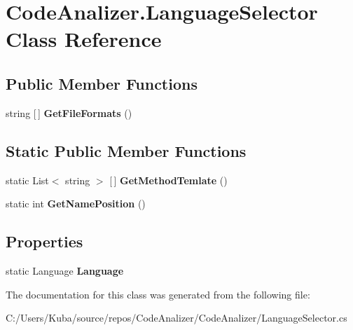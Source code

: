 \hypertarget{class_code_analizer_1_1_language_selector}{}\section{Code\+Analizer.\+Language\+Selector Class Reference}
\label{class_code_analizer_1_1_language_selector}
\subsection*{Public Member Functions}
\begin{DoxyCompactItemize}
\item 
\mbox{\label{class_code_analizer_1_1_language_selector_a47eec0d09263dfb91cb3041555838442}} 
string \mbox{[}$\,$\mbox{]} {\bfseries Get\+File\+Formats} ()
\end{DoxyCompactItemize}
\subsection*{Static Public Member Functions}
\begin{DoxyCompactItemize}
\item 
\mbox{\label{class_code_analizer_1_1_language_selector_a475679af5bcd01f897f8ecc7a8ac9589}} 
static List$<$ string $>$ \mbox{[}$\,$\mbox{]} {\bfseries Get\+Method\+Temlate} ()
\item 
\mbox{\label{class_code_analizer_1_1_language_selector_a1185c77c756b6ed4a85825edafc7d196}} 
static int {\bfseries Get\+Name\+Position} ()
\end{DoxyCompactItemize}
\subsection*{Properties}
\begin{DoxyCompactItemize}
\item 
\mbox{\label{class_code_analizer_1_1_language_selector_ac6c633963b73024076b528cb5d45467f}} 
static Language {\bfseries Language}
\end{DoxyCompactItemize}


The documentation for this class was generated from the following file\+:\begin{DoxyCompactItemize}
\item 
C\+:/\+Users/\+Kuba/source/repos/\+Code\+Analizer/\+Code\+Analizer/Language\+Selector.\+cs\end{DoxyCompactItemize}
